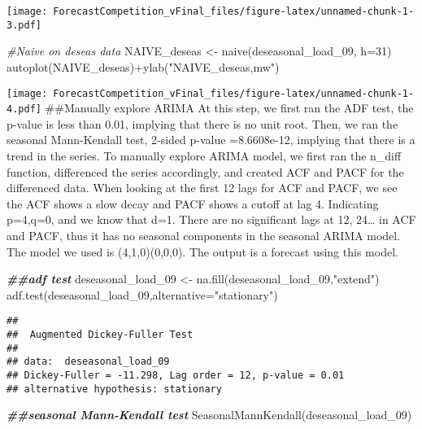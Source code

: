 \documentclass[
]{article}
\newenvironment{Shaded}{\begin{snugshade}}{\end{snugshade}}
\newcommand{\AttributeTok}[1]{\textcolor[rgb]{0.77,0.63,0.00}{#1}}
\newcommand{\CommentTok}[1]{\textcolor[rgb]{0.56,0.35,0.01}{\textit{#1}}}
\newcommand{\DecValTok}[1]{\textcolor[rgb]{0.00,0.00,0.81}{#1}}
\newcommand{\DocumentationTok}[1]{\textcolor[rgb]{0.56,0.35,0.01}{\textbf{\textit{#1}}}}
\newcommand{\FunctionTok}[1]{\textcolor[rgb]{0.00,0.00,0.00}{#1}}
\newcommand{\NormalTok}[1]{#1}
\newcommand{\OtherTok}[1]{\textcolor[rgb]{0.56,0.35,0.01}{#1}}
\newcommand{\SpecialCharTok}[1]{\textcolor[rgb]{0.00,0.00,0.00}{#1}}
\newcommand{\StringTok}[1]{\textcolor[rgb]{0.31,0.60,0.02}{#1}}
\begin{document}
\texttt{[image: ForecastCompetition\_vFinal\_files/figure-latex/unnamed-chunk-1-3.pdf]}

\begin{Shaded}
\begin{Highlighting}[]
\CommentTok{\#Naive on deseas data}
\NormalTok{NAIVE\_deseas }\OtherTok{\textless{}{-}} \FunctionTok{naive}\NormalTok{(deseasonal\_load\_09, }\AttributeTok{h=}\DecValTok{31}\NormalTok{)}
\FunctionTok{autoplot}\NormalTok{(NAIVE\_deseas)}\SpecialCharTok{+}\FunctionTok{ylab}\NormalTok{(}\StringTok{"NAIVE\_deseas,mw"}\NormalTok{)}
\end{Highlighting}
\end{Shaded}

\texttt{[image: ForecastCompetition\_vFinal\_files/figure-latex/unnamed-chunk-1-4.pdf]}
\#\#Manually explore ARIMA At this step, we first ran the ADF test, the
p-value is less than 0.01, implying that there is no unit root. Then, we
ran the seasonal Mann-Kendall test, 2-sided p-value =8.6608e-12,
implying that there is a trend in the series. To manually explore ARIMA
model, we first ran the n\_diff function, differenced the series
accordingly, and created ACF and PACF for the differenced data. When
looking at the first 12 lags for ACF and PACF, we see the ACF shows a
slow decay and PACF shows a cutoff at lag 4. Indicating p=4,q=0, and we
know that d=1. There are no significant lags at 12, 24\ldots{} in ACF
and PACF, thus it has no seasonal components in the seasonal ARIMA
model. The model we used is (4,1,0)(0,0,0). The output is a forecast
using this model.

\begin{Shaded}
\begin{Highlighting}[]
\DocumentationTok{\#\#adf test}
\NormalTok{deseasonal\_load\_09 }\OtherTok{\textless{}{-}} \FunctionTok{na.fill}\NormalTok{(deseasonal\_load\_09,}\StringTok{"extend"}\NormalTok{)}
\FunctionTok{adf.test}\NormalTok{(deseasonal\_load\_09,}\AttributeTok{alternative=}\StringTok{"stationary"}\NormalTok{)}
\end{Highlighting}
\end{Shaded}

\begin{verbatim}
## 
##  Augmented Dickey-Fuller Test
## 
## data:  deseasonal_load_09
## Dickey-Fuller = -11.298, Lag order = 12, p-value = 0.01
## alternative hypothesis: stationary
\end{verbatim}

\begin{Shaded}
\begin{Highlighting}[]
\DocumentationTok{\#\#seasonal Mann{-}Kendall test}
\FunctionTok{SeasonalMannKendall}\NormalTok{(deseasonal\_load\_09)}
\end{Highlighting}
\end{Shaded}
\end{document}
